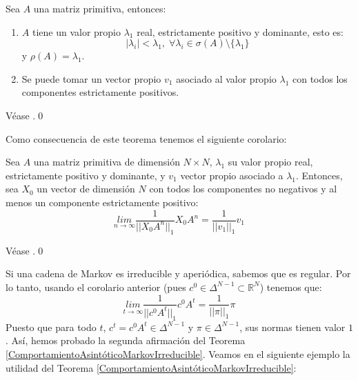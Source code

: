 \begin{theorem}
    Sea $A$ una matriz primitiva, entonces:
    \begin{enumerate}
        \item $A$ tiene un valor propio $\lambda_1$ real, estrictamente positivo y dominante, esto es:
        \[|\lambda_i|<\lambda_1,\; \forall\lambda_i\in\sigma(A)\setminus \{\lambda_1\}\]
        y $\rho(A)=\lambda_1$.
        \item Se puede tomar un vector propio $v_1$ asociado al valor propio $\lambda_1$ con todos los componentes estrictamente positivos.
    \end{enumerate}
\end{theorem}
\begin{proofs*}
    Véase \cite[Página 199, Teoremas 5.12 y 5.13]{Salinelli}.\qed
\end{proofs*}
Como consecuencia de este teorema tenemos el siguiente corolario:
\begin{corollary}
    Sea $A$ una matriz primitiva de dimensión $N\times N$, $\lambda_1$ su valor propio real, estrictamente positivo y dominante, y $v_1$ vector propio asociado a $\lambda_1$. Entonces, sea $X_0$ un vector de dimensión $N$ con todos los componentes no negativos y al menos un componente estrictamente positivo:
    \[\underset{n\rightarrow\infty}{lim}\frac{1}{||X_0A^n||_1}X_0A^n=\frac{1}{||v_1||_1}v_1\]
\end{corollary}
\begin{proofs*}
    Véase \cite[Página 201, Teorema 5.19]{Salinelli}.\qed
\end{proofs*}
Si una cadena de Markov es irreducible y aperiódica, sabemos que es regular. Por lo tanto, usando el corolario anterior (pues $c^0\in\Delta^{N-1}\subset\mathbb{R}^N$) tenemos que:
    \[\underset{t\rightarrow\infty}{lim}\frac{1}{||c^0A^t||_1}c^0A^t=\frac{1}{||\pi||_1}\pi\]
Puesto que para todo $t$, $c^t=c^0A^t\in\Delta^{N-1}$ y $\pi\in\Delta^{N-1}$, sus normas tienen valor $1$. Así, hemos probado la segunda afirmación del Teorema \ref{ComportamientoAsintóticoMarkovIrreducible}. Veamos en el siguiente ejemplo \cite[Página 102]{Matrices_positivas} la utilidad del Teorema \ref{ComportamientoAsintóticoMarkovIrreducible}: 

